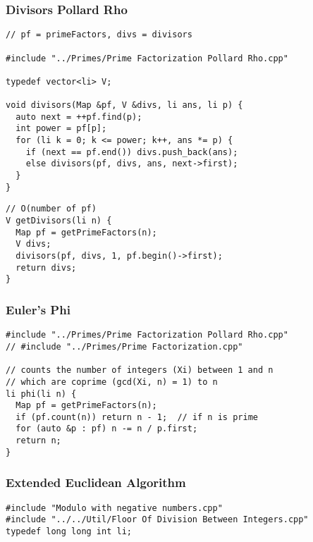 \documentclass[twoside]{article}
\begin{document}
\begin{multicols*}{2}
\subsubsectionfont{\large\bfseries\sffamily\underline}
\subsubsection*{Divisors Pollard Rho}
\begin{verbatim}
// pf = primeFactors, divs = divisors

#include "../Primes/Prime Factorization Pollard Rho.cpp"

typedef vector<li> V;

void divisors(Map &pf, V &divs, li ans, li p) {
  auto next = ++pf.find(p);
  int power = pf[p];
  for (li k = 0; k <= power; k++, ans *= p) {
    if (next == pf.end()) divs.push_back(ans);
    else divisors(pf, divs, ans, next->first);
  }
}
\end{verbatim}
\vspace{-12pt}
\begin{verbatim}
// O(number of pf)
V getDivisors(li n) {
  Map pf = getPrimeFactors(n);
  V divs;
  divisors(pf, divs, 1, pf.begin()->first);
  return divs;
}
\end{verbatim}

\subsubsectionfont{\large\bfseries\sffamily\underline}
\subsubsection*{Euler's Phi}
\begin{verbatim}
#include "../Primes/Prime Factorization Pollard Rho.cpp"
// #include "../Primes/Prime Factorization.cpp"

// counts the number of integers (Xi) between 1 and n
// which are coprime (gcd(Xi, n) = 1) to n
li phi(li n) {
  Map pf = getPrimeFactors(n);
  if (pf.count(n)) return n - 1;  // if n is prime
  for (auto &p : pf) n -= n / p.first;
  return n;
}
\end{verbatim}

\subsubsectionfont{\large\bfseries\sffamily\underline}
\subsubsection*{Extended Euclidean Algorithm}
\begin{verbatim}
#include "Modulo with negative numbers.cpp"
#include "../../Util/Floor Of Division Between Integers.cpp"
typedef long long int li;


\end{verbatim}
\end{multicols*}
\end{document}
